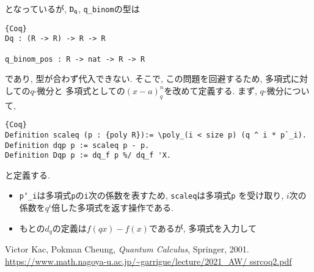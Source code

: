 \documentclass[11pt]{jarticle}
\theoremstyle{mystyle}
\newcommand{\0}{\textbf{0}}
\newcommand{\1}{\textbf{1}}
\newcommand{\2}{\textbf{2}}
\begin{document}
となっているが, ${\tt D}_{\tt q}$, {\tt q\_binom}の型は
\begin{lstlisting}{Coq}
Dq : (R -> R) -> R -> R

q_binom_pos : R -> nat -> R -> R \end{lstlisting}
であり, 型が合わず代入できない. そこで, この問題を回避するため, 多項式に対しての$q$-微分と
多項式としての$(x - a)^n_q$を改めて定義する. まず, $q$-微分について, 
\begin{lstlisting}{Coq}
Definition scaleq (p : {poly R}):= \poly_(i < size p) (q ^ i * p`_i).
Definition dqp p := scaleq p - p.
Definition Dqp p := dq_f p %/ dq_f 'X.
\end{lstlisting}
と定義する. 
\begin{itemize}
  \item {\tt p`\_i}は多項式{\tt p}の{\tt i}次の係数を表すため, {\tt scaleq}は多項式{\tt p}
    を受け取り, $i$次の係数を$q^i$倍した多項式を返す操作である.
  \item もとの$d_q$の定義は$f(qx) - f(x)$であるが, 多項式を入力して
\end{itemize}
\begin{thebibliography}{9}
   Victor Kac, Pokman Cheung, {\it{Quantum Calculus}}, Springer, 2001.
   \url{https://www.math.nagoya-u.ac.jp/~garrigue/lecture/2021_AW/                  
                           ssrcoq2.pdf}
\end{thebibliography}
\end{document}
